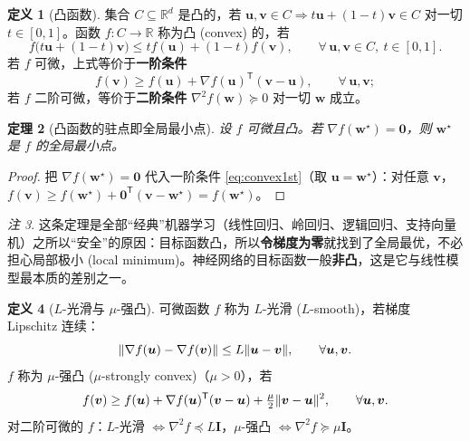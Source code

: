 \documentclass[UTF8,a4paper,11pt]{ctexart}
\theoremstyle{definition}
\newtheorem{definition}{定义}[section]
\theoremstyle{plain}
\newtheorem{theorem}[definition]{定理}
\theoremstyle{remark}
\newtheorem{remark}[definition]{注}
\DeclarePairedDelimiter{\norm}{\lVert}{\rVert}
\newcommand{\R}{\mathbb{R}}
\newcommand{\T}{^{\mathsf{T}}}
\newcommand{\eng}[1]{\textup{(#1)}}
\begin{document}
\begin{definition}[凸函数]\label{def:convex}
集合 $C\subseteq\R^d$ 是凸的，若 $\bm{u},\bm{v}\in C\Rightarrow t\bm{u}+(1-t)\bm{v}\in C$ 对一切 $t\in[0,1]$。函数 $f:C\to\R$ 称为凸 \eng{convex} 的，若
\[
  f\big(t\bm{u}+(1-t)\bm{v}\big)\le t f(\bm{u})+(1-t)f(\bm{v}),\qquad\forall\,\bm{u},\bm{v}\in C,\ t\in[0,1].
\]
若 $f$ 可微，上式等价于\textbf{一阶条件}
\begin{equation}\label{eq:convex1st}
  f(\bm{v})\ge f(\bm{u})+\nabla f(\bm{u})\T(\bm{v}-\bm{u}),\qquad\forall\,\bm{u},\bm{v};
\end{equation}
若 $f$ 二阶可微，等价于\textbf{二阶条件} $\nabla^2f(\bm{w})\succeq0$ 对一切 $\bm{w}$ 成立。
\end{definition}

\begin{theorem}[凸函数的驻点即全局最小点]\label{thm:convexmin}
设 $f$ 可微且凸。若 $\nabla f(\bm{w}^\star)=\bm{0}$，则 $\bm{w}^\star$ 是 $f$ 的全局最小点。
\end{theorem}

\begin{proof}
把 $\nabla f(\bm{w}^\star)=\bm{0}$ 代入一阶条件 \eqref{eq:convex1st}（取 $\bm{u}=\bm{w}^\star$）：对任意 $\bm{v}$，
$f(\bm{v})\ge f(\bm{w}^\star)+\bm{0}\T(\bm{v}-\bm{w}^\star)=f(\bm{w}^\star)$。
\end{proof}

\begin{remark}
这条定理是全部“经典”机器学习（线性回归、岭回归、逻辑回归、支持向量机）之所以“安全”的原因：目标函数凸，所以\textbf{令梯度为零}就找到了全局最优，不必担心局部极小 \eng{local minimum}。神经网络的目标函数一般\textbf{非凸}，这是它与线性模型最本质的差别之一。
\end{remark}

\begin{definition}[$L$-光滑与 $\mu$-强凸]\label{def:smooth}
可微函数 $f$ 称为 $L$-光滑 \eng{$L$-smooth}，若梯度 Lipschitz 连续：
\[
  \norm{\nabla f(\bm{u})-\nabla f(\bm{v})}\le L\norm{\bm{u}-\bm{v}},\qquad\forall\bm{u},\bm{v}.
\]
$f$ 称为 $\mu$-强凸 \eng{$\mu$-strongly convex}（$\mu>0$），若
\begin{equation}\label{eq:sc}
  f(\bm{v})\ge f(\bm{u})+\nabla f(\bm{u})\T(\bm{v}-\bm{u})+\tfrac{\mu}{2}\norm{\bm{v}-\bm{u}}^2,\qquad\forall\bm{u},\bm{v}.
\end{equation}
对二阶可微的 $f$：$L$-光滑 $\iff\nabla^2f\preceq L\bm{I}$，$\mu$-强凸 $\iff\nabla^2f\succeq\mu\bm{I}$。
\end{definition}
\end{document}
